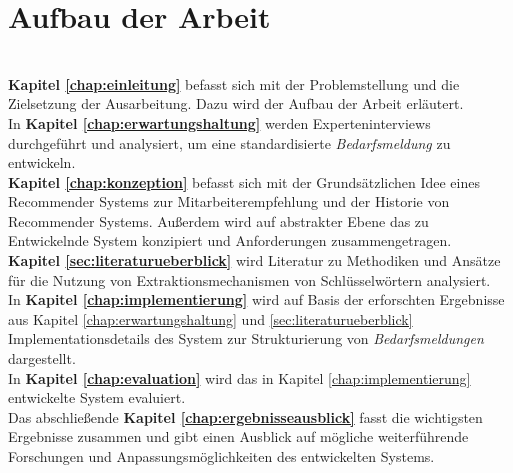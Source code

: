 \section{Aufbau der Arbeit}
\\

\textbf{Kapitel \ref{chap:einleitung} } befasst sich mit der Problemstellung und die Zielsetzung der Ausarbeitung. Dazu wird der Aufbau der Arbeit erläutert.\\

In \textbf{Kapitel \ref{chap:erwartungshaltung} } werden Experteninterviews durchgeführt und analysiert, um eine standardisierte \emph{Bedarfsmeldung} zu entwickeln. \\

\textbf{Kapitel \ref{chap:konzeption} } befasst sich mit der Grundsätzlichen Idee eines Recommender Systems zur Mitarbeiterempfehlung und der Historie von Recommender Systems. Außerdem wird auf abstrakter Ebene das zu Entwickelnde System konzipiert und Anforderungen zusammengetragen.\\

\textbf{Kapitel \ref{sec:literaturueberblick} } wird Literatur zu Methodiken und Ansätze für die Nutzung von Extraktionsmechanismen von Schlüsselwörtern analysiert. \\

In \textbf{Kapitel \ref{chap:implementierung} } wird auf Basis der erforschten Ergebnisse aus Kapitel \ref{chap:erwartungshaltung} und \ref{sec:literaturueberblick} Implementationsdetails des System zur Strukturierung von \emph{Bedarfsmeldungen} dargestellt. \\

In \textbf{Kapitel \ref{chap:evaluation} } wird das in Kapitel \ref{chap:implementierung} entwickelte System evaluiert. \\

Das abschließende \textbf{Kapitel \ref{chap:ergebnisseausblick} } fasst die wichtigsten Ergebnisse zusammen und gibt einen Ausblick auf mögliche weiterführende Forschungen und Anpassungsmöglichkeiten des entwickelten Systems. \\
\newpage
